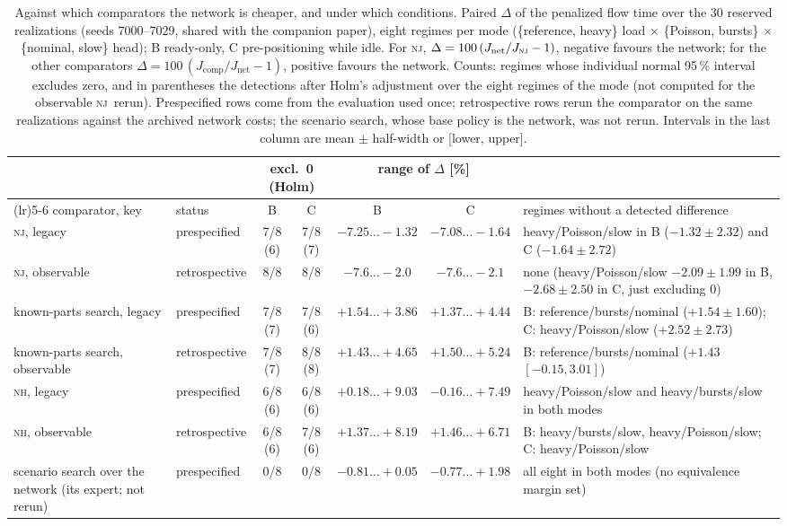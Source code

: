 \documentclass[11pt,a4paper]{article}
\theoremstyle{plain}
\theoremstyle{definition}
\theoremstyle{remark}
\newcommand{\nj}{\textsc{nj}}
\newcommand{\nh}{\textsc{nh}}
\begin{document}
\begin{table}[t]
\centering\footnotesize
\caption{Against which comparators the network is cheaper, and under which conditions.
Paired $\Delta$ of the penalized flow time over the 30 reserved realizations (seeds
7000--7029, shared with the companion paper), eight regimes per mode (\{reference, heavy\}
load $\times$ \{Poisson, bursts\} $\times$ \{nominal, slow\} head); B ready-only, C
pre-positioning while idle. For \nj, $\Delta=100\,(J_{\mathrm{net}}/J_{\nj}-1)$, negative
favours the network; for the other comparators $\Delta=100\,(J_{\mathrm{comp}}/J_{\mathrm{net}}-1)$,
positive favours the network. Counts: regimes whose individual normal 95\,\% interval
excludes zero, and in parentheses the detections after Holm's adjustment over the eight
regimes of the mode (not computed for the observable \nj\ rerun). Prespecified rows come
from the evaluation used once; retrospective rows rerun the comparator on the same
realizations against the archived network costs; the scenario search, whose base policy is
the network, was not rerun. Intervals in the last column are
mean $\pm$ half-width or [lower, upper].}
\label{tab:summary}
\setlength{\tabcolsep}{3pt}
\begin{tabularx}{\linewidth}{@{}>{\raggedright\arraybackslash}p{2.25cm}>{\raggedright\arraybackslash}p{1.9cm}cccc>{\raggedright\arraybackslash}X@{}}
\toprule
 & & \multicolumn{2}{c}{excl.\ 0 (Holm)} & \multicolumn{2}{c}{range of $\Delta$ [\%]} & \\
\cmidrule(lr){3-4}\cmidrule(lr){5-6}
comparator, key & status & B & C & B & C & regimes without a detected difference\\
\midrule
\nj, legacy & prespecified & 7/8 (6) & 7/8 (7) & $-7.25\ldots-1.32$ & $-7.08\ldots-1.64$ & heavy/Poisson/slow in B ($-1.32\pm2.32$) and C ($-1.64\pm2.72$)\\
\nj, observable & retrospective & 8/8 & 8/8 & $-7.6\ldots-2.0$ & $-7.6\ldots-2.1$ & none (heavy/Poisson/slow $-2.09\pm1.99$ in B, $-2.68\pm2.50$ in C, just excluding 0)\\
\addlinespace
known-parts search, legacy & prespecified & 7/8 (7) & 7/8 (6) & $+1.54\ldots+3.86$ & $+1.37\ldots+4.44$ & B: reference/bursts/nominal ($+1.54\pm1.60$); C: heavy/Poisson/slow ($+2.52\pm2.73$)\\
known-parts search, observable & retrospective & 7/8 (7) & 8/8 (8) & $+1.43\ldots+4.65$ & $+1.50\ldots+5.24$ & B: reference/bursts/nominal ($+1.43$ $[-0.15,3.01]$)\\
\addlinespace
\nh, legacy & prespecified & 6/8 (6) & 6/8 (6) & $+0.18\ldots+9.03$ & $-0.16\ldots+7.49$ & heavy/Poisson/slow and heavy/bursts/slow in both modes\\
\nh, observable & retrospective & 6/8 (6) & 7/8 (6) & $+1.37\ldots+8.19$ & $+1.46\ldots+6.71$ & B: heavy/bursts/slow, heavy/Poisson/slow; C: heavy/Poisson/slow\\
\addlinespace
scenario search over the network (its expert; not rerun) & prespecified & 0/8 & 0/8 & $-0.81\ldots+0.05$ & $-0.77\ldots+1.98$ & all eight in both modes (no equivalence margin set)\\
\bottomrule
\end{tabularx}
\end{table}
\end{document}
